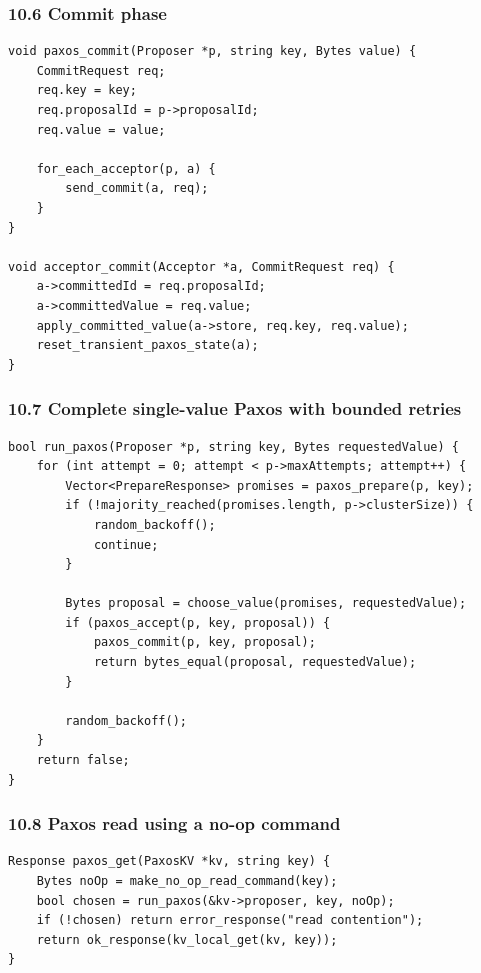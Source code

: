 \documentclass[10pt,letterpaper]{article}
\begin{document}
\subsubsection*{10.6 Commit phase}

\begin{verbatim}
void paxos_commit(Proposer *p, string key, Bytes value) {
    CommitRequest req;
    req.key = key;
    req.proposalId = p->proposalId;
    req.value = value;

    for_each_acceptor(p, a) {
        send_commit(a, req);
    }
}

void acceptor_commit(Acceptor *a, CommitRequest req) {
    a->committedId = req.proposalId;
    a->committedValue = req.value;
    apply_committed_value(a->store, req.key, req.value);
    reset_transient_paxos_state(a);
}
\end{verbatim}

\subsubsection*{10.7 Complete single-value Paxos with bounded retries}

\begin{verbatim}
bool run_paxos(Proposer *p, string key, Bytes requestedValue) {
    for (int attempt = 0; attempt < p->maxAttempts; attempt++) {
        Vector<PrepareResponse> promises = paxos_prepare(p, key);
        if (!majority_reached(promises.length, p->clusterSize)) {
            random_backoff();
            continue;
        }

        Bytes proposal = choose_value(promises, requestedValue);
        if (paxos_accept(p, key, proposal)) {
            paxos_commit(p, key, proposal);
            return bytes_equal(proposal, requestedValue);
        }

        random_backoff();
    }
    return false;
}
\end{verbatim}

\subsubsection*{10.8 Paxos read using a no-op command}

\begin{verbatim}
Response paxos_get(PaxosKV *kv, string key) {
    Bytes noOp = make_no_op_read_command(key);
    bool chosen = run_paxos(&kv->proposer, key, noOp);
    if (!chosen) return error_response("read contention");
    return ok_response(kv_local_get(kv, key));
}
\end{verbatim}
\end{document}
